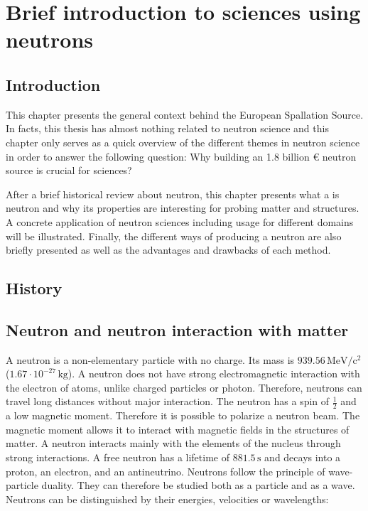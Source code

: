 \chapter{Brief introduction to sciences using neutrons}
\cleardoublepage

\minitoc

\section{Introduction}
\begin{refsection}
  \label{ch1:Introduction}
  This chapter presents the general context behind the European Spallation Source. In facts, this thesis has almost nothing related to neutron science and this chapter only serves as a quick overview of the different themes in neutron science in order to answer the following question: Why building an 1.8 billion € neutron source is crucial for sciences?

  After a brief historical review about neutron, this chapter presents what a is neutron and why its properties are interesting for probing matter and structures. A concrete application of neutron sciences including usage for different domains will be illustrated. Finally, the different ways of producing a neutron are also briefly presented as well as the advantages and drawbacks of each method.

  \section{History}
  \cite{Chadwick1932}

  \section{Neutron and neutron interaction with matter}
  \label{ch1:sec:Neutron}
  A neutron is a non-elementary particle with no charge. Its mass is $939.56\,\mathrm{MeV/c^{2}}$ ($1.67 \cdot 10^{-27}\,\mathrm{kg}$). A neutron does not have strong electromagnetic interaction with the electron of atoms, unlike charged particles or photon. Therefore, neutrons can travel long distances without major interaction. The neutron has a spin of $\frac{1}{2}$ and a low magnetic moment. Therefore it is possible to polarize a neutron beam. The magnetic moment allows it to interact with magnetic fields in the structures of matter. A neutron interacts mainly with the elements of the nucleus through strong interactions. A free neutron has a lifetime of $881.5\,\mathrm{s}$ and decays into a proton, an electron, and an antineutrino.
  Neutrons follow the principle of wave-particle duality. They can therefore be studied both as a particle and as a wave. Neutrons can be distinguished by their energies, velocities or wavelengths:


\end{refsection}
